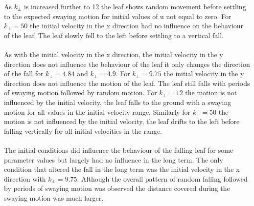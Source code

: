 As $k_{\perp}$ is increased further to 12 the leaf shows random movement before settling to the expected swaying motion for initial values of u not equal to zero. For $k_{\perp}=50$ the initial velocity in the x direction had no influence on the behaviour of the leaf. The leaf slowly fell to the left before settling to a vertical fall. 
\\
\\
As with the initial velocity in the x direction, the initial velocity in the y direction does not influence the behaviour of the leaf it only changes the direction of the fall for $k_{\perp}=4.84$ and $k_{\perp}=4.9$.
For $k_{\perp}=9.75$ the initial velocity in the y direction does not influence the motion of the leaf. The leaf still falls with periods of swaying motion followed by random motion. %
For $k_{\perp}=12$ the motion is not influenced by the initial velocity, the leaf falls to the ground with a swaying motion for all values in the initial velocity range. Similarly for $k_{\perp}=50$ the motion is not influenced by the initial velocity, the leaf drifts to the left before falling vertically for all initial velocities in the range.
\\
\\
The initial conditions did influence the behaviour of the falling leaf for some parameter values but largely had no influence in the long term. The only condition that altered the fall in the long term was the initial velocity in the x direction with $k_{\perp}=9.75$. Although the overall pattern of random falling followed by periods of swaying motion was observed the distance covered during the swaying motion was much larger. 
\\
\\